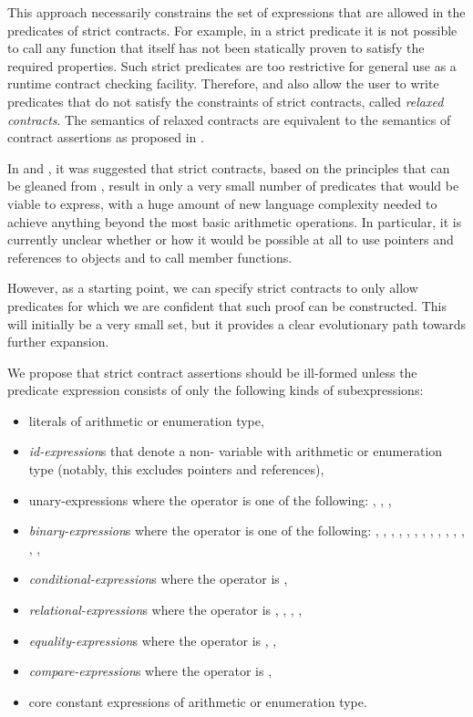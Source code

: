 This approach necessarily  constrains the set of expressions that are allowed in the predicates of strict contracts. For example, in a strict predicate it is not possible to call any function that itself has not been statically proven to satisfy the required properties. Such strict predicates are too restrictive for general use as a runtime contract checking facility. Therefore, \cite{P2680R1} and \cite{P3285R0} also allow the user to write predicates that do not satisfy the constraints of strict contracts, called \emph{relaxed contracts}. The semantics of relaxed contracts are equivalent to the semantics of contract assertions as proposed in \cite{P2900R11}.

 In \cite{P3376R0} and \cite{P3386R0}, it was suggested that strict contracts, based on the principles that can be gleaned from \cite{P3285R0}, result in only a very small number of predicates that would be viable to express, with a huge amount of new language complexity needed to achieve anything beyond the most basic arithmetic operations. In particular, it is currently unclear whether or how it would be possible at all to use pointers and references to objects and to call member functions.
 
However, as a starting point, we can specify strict contracts to only allow predicates for which we are confident that such proof can be constructed. This will initially be a very small set, but it provides a clear evolutionary path towards further expansion.

We propose that strict contract assertions should be ill-formed unless the predicate expression consists of only the following kinds of subexpressions:

\begin{itemize}
\item literals of arithmetic or enumeration type,
\item \emph{id-expression}s that denote a non- variable with arithmetic or enumeration type (notably, this excludes pointers and references),
\item unary-expressions where the operator is one of the following: \tcode{+}, \tcode{-}, \tcode{!}, \tcode{~}
\item \emph{binary-expression}s where the operator is one of the following: \tcode{+}, \tcode{-}, \tcode{/}, \tcode{\%}, \tcode{*}, \tcode{!}, \tcode{~}, \tcode{\^}, \tcode{|}, \tcode{||}, \tcode{\&}, \tcode{\&\&}, \tcode{<<}, \tcode{>>},
\item \emph{conditional-expression}s where the operator is ,
\item \emph{relational-expression}s where the operator is \tcode{<}, \tcode{>}, \tcode{<=}, \tcode{>=},
\item \emph{equality-expression}s where the operator is \tcode{==}, \tcode{!=},
\item \emph{compare-expression}s where the operator is \tcode{<=>},
\item core constant expressions of arithmetic or enumeration type.
\end{itemize}

